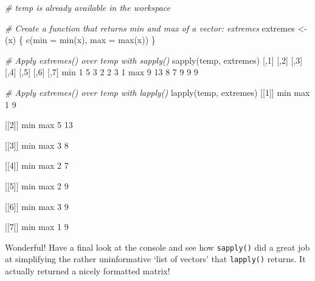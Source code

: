 \documentclass[]{article}
\newcommand{\hlnum}[1]{\textcolor[rgb]{0.816,0.125,0.439}{#1}}%
\newcommand{\hlstr}[1]{\textcolor[rgb]{0.251,0.627,0.251}{#1}}%
\newcommand{\hlcom}[1]{\textcolor[rgb]{0.502,0.502,0.502}{\textit{#1}}}%
\newcommand{\hlstd}[1]{\textcolor[rgb]{0.251,0.251,0.251}{#1}}%
\newcommand{\hlkwc}[1]{\textcolor[rgb]{0.251,0.251,0.251}{#1}}%
\newcommand{\hlkwd}[1]{\textcolor[rgb]{0.878,0.439,0.125}{#1}}%
\newenvironment{Shaded}{\begin{myshaded}}{\end{myshaded}}
\newcommand{\KeywordTok}[1]{\hlkwd{#1}}
\newcommand{\DataTypeTok}[1]{\hlkwc{#1}}
\newcommand{\DecValTok}[1]{\hlnum{#1}}
\newcommand{\StringTok}[1]{\hlstr{#1}}
\newcommand{\CommentTok}[1]{\hlcom{#1}}
\newcommand{\NormalTok}[1]{\hlstd{#1}}
\begin{document}
\begin{Shaded}
\begin{Highlighting}[]
\CommentTok{# temp is already available in the workspace}

\CommentTok{# Create a function that returns min and max of a vector: extremes}
\NormalTok{extremes <-}\StringTok{ }\NormalTok{(x) \{}
  \KeywordTok{c}\NormalTok{(}\DataTypeTok{min =} \KeywordTok{min}\NormalTok{(x), }\DataTypeTok{max =} \KeywordTok{max}\NormalTok{(x))}
\NormalTok{\}}

\CommentTok{# Apply extremes() over temp with sapply()}
\KeywordTok{sapply}\NormalTok{(temp, extremes)}
\NormalTok{       [,}\DecValTok{1}\NormalTok{] [,}\DecValTok{2}\NormalTok{] [,}\DecValTok{3}\NormalTok{] [,}\DecValTok{4}\NormalTok{] [,}\DecValTok{5}\NormalTok{] [,}\DecValTok{6}\NormalTok{] [,}\DecValTok{7}\NormalTok{]}
\NormalTok{   min   }\OperatorTok{-}\DecValTok{1}    \DecValTok{5}   \OperatorTok{-}\DecValTok{3}   \OperatorTok{-}\DecValTok{2}    \DecValTok{2}   \OperatorTok{-}\DecValTok{3}    \DecValTok{1}
\NormalTok{   max    }\DecValTok{9}   \DecValTok{13}    \DecValTok{8}    \DecValTok{7}    \DecValTok{9}    \DecValTok{9}    \DecValTok{9}

\CommentTok{# Apply extremes() over temp with lapply()}
\KeywordTok{lapply}\NormalTok{(temp, extremes)}
\NormalTok{   [[}\DecValTok{1}\NormalTok{]]}
\NormalTok{   min max }
    \OperatorTok{-}\DecValTok{1}   \DecValTok{9} 
   
\NormalTok{   [[}\DecValTok{2}\NormalTok{]]}
\NormalTok{   min max }
     \DecValTok{5}  \DecValTok{13} 
   
\NormalTok{   [[}\DecValTok{3}\NormalTok{]]}
\NormalTok{   min max }
    \OperatorTok{-}\DecValTok{3}   \DecValTok{8} 
   
\NormalTok{   [[}\DecValTok{4}\NormalTok{]]}
\NormalTok{   min max }
    \OperatorTok{-}\DecValTok{2}   \DecValTok{7} 
   
\NormalTok{   [[}\DecValTok{5}\NormalTok{]]}
\NormalTok{   min max }
     \DecValTok{2}   \DecValTok{9} 
   
\NormalTok{   [[}\DecValTok{6}\NormalTok{]]}
\NormalTok{   min max }
    \OperatorTok{-}\DecValTok{3}   \DecValTok{9} 
   
\NormalTok{   [[}\DecValTok{7}\NormalTok{]]}
\NormalTok{   min max }
     \DecValTok{1}   \DecValTok{9}
\end{Highlighting}
\end{Shaded}

Wonderful! Have a final look at the console and see how
\texttt{sapply()} did a great job at simplifying the rather
uninformative `list of vectors' that \texttt{lapply()} returns. It
actually returned a nicely formatted matrix!
\end{document}

